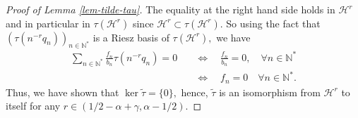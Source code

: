 \documentclass[11pt, dvipsnames]{amsart}
\begin{document}
\begin{proof}[Proof of Lemma \ref{lem-tilde-tau}]
   The equality at the right hand side holds in $\mathcal{H}^r$ and in particular in $\tau(\mathcal{H}^r)$ since $\mathcal{H}^r\subset \tau(\mathcal{H}^r).$ So using the fact that $(\tau(n^{-r} q_n))_{n\in \mathbb{N}^*}$ is a Riesz basis of $\tau(\mathcal{H}^r),$ we have
   \begin{align*}
       \sum_{n\in \mathbb{N^*}}\frac{f_n}{b_n} \tau(n^{-r} q_n)=0&\quad \Leftrightarrow \quad \frac{f_n}{b_n}=0, \quad \forall n\in\mathbb{N}^*\\
       &\quad \Leftrightarrow \quad f_n=0\quad \forall n\in\mathbb{N}^*.
   \end{align*}
   Thus, we have shown that $\ker \tilde \tau=\{0\},$ hence, $\tilde \tau$ is an isomorphism from $\mathcal{H}^r$ to itself for any $r\in (1/2-\alpha+\gamma,\alpha-1/2).$
\end{proof}
\end{document}
